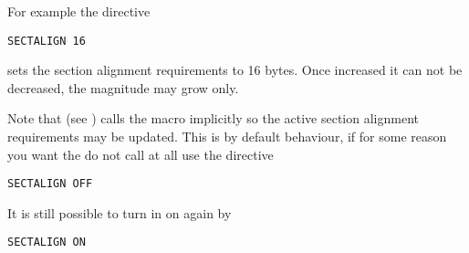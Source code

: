 For example the directive

\begin{lstlisting}
SECTALIGN 16
\end{lstlisting}

sets the section alignment requirements to 16 bytes. Once increased it can
not be decreased, the magnitude may grow only.

Note that  (see ) calls the 
macro implicitly so the active section alignment requirements may be updated.
This is by default behaviour, if for some reason you want the 
do not call  at all use the directive

\begin{lstlisting}
SECTALIGN OFF
\end{lstlisting}

It is still possible to turn in on again by

\begin{lstlisting}
SECTALIGN ON
\end{lstlisting}
